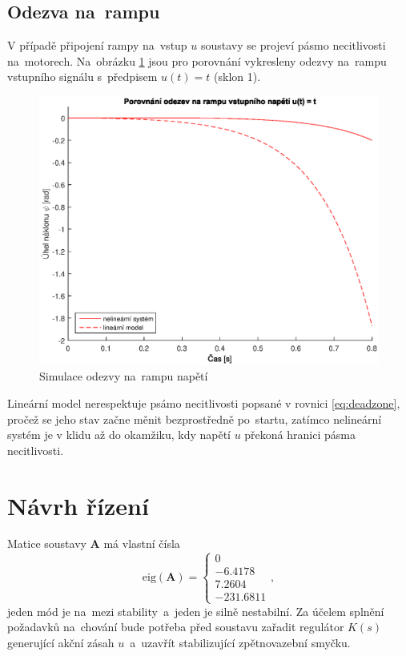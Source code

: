 \documentclass[conference]{IEEEtran}
\begin{document}
\subsection{Odezva na~rampu}
V případě připojení rampy na~vstup $u$ soustavy se projeví pásmo necitlivosti na~motorech. Na~obrázku \ref{fig:porovnani_rampa} jsou pro porovnání
vykresleny odezvy na~rampu vstupního signálu s~předpisem $u(t) = t$ (sklon 1). 
\begin{figure}[htbp]
    \centerline{\includegraphics[width=\linewidth]{porovnani_rampa.eps}}
    \caption{Simulace odezvy na~rampu napětí}
    \label{fig:porovnani_rampa}        
\end{figure}
Lineární model nerespektuje psámo necitlivosti popsané v rovnici \eqref{eq:deadzone}, pročež se jeho stav začne měnit bezprostředně po~startu,
zatímco nelineární systém je v klidu až do okamžiku, kdy napětí $u$ překoná hranici pásma necitlivosti.

\section{Návrh řízení}
Matice soustavy $\textbf{A}$ má vlastní čísla 
\begin{equation}
	\text{eig}(\mathbf{A}) =
	\begin{cases}
        0 \\
        -6.4178 \\
        7.2604 \\
        -231.6811
    \end{cases},
    \label{eq:unstable_poles}
\end{equation}
jeden mód je na~mezi stability~a~jeden je silně nestabilní. Za účelem splnění požadavků na~chování bude potřeba před soustavu zařadit regulátor $K(s)$ generující
akční zásah $u$~a~uzavřít stabilizující zpětnovazební smyčku.
\end{document}
